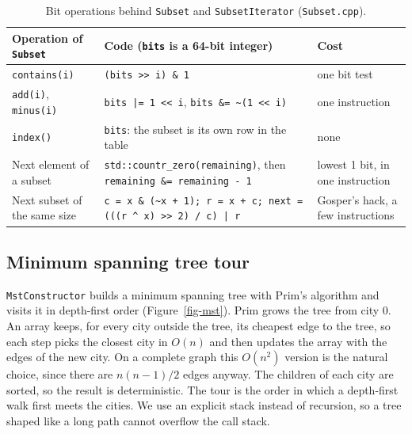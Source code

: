 \documentclass[10pt,a4paper]{article}
\begin{document}
\begin{table}[H]
\centering\footnotesize
\begin{tabularx}{\linewidth}{@{}L{3.6cm} L{7.4cm} Y@{}}
\toprule
Operation of \texttt{Subset} & Code (\texttt{bits} is a 64-bit integer) & Cost \\
\midrule
\texttt{contains(i)} & \texttt{(bits >{}> i) \& 1} & one bit test \\
\texttt{add(i)}, \texttt{minus(i)} & \texttt{bits |= 1 <{}< i}, \quad \texttt{bits \&= \textasciitilde(1 <{}< i)} & one instruction \\
\texttt{index()} & \texttt{bits}: the subset is its own row in the table & none \\
Next element of a subset & \texttt{std::countr\_zero(remaining)}, then \texttt{remaining \&= remaining - 1} & lowest 1 bit, in one instruction \\
Next subset of the same size & \texttt{c = x \& (\textasciitilde x + 1); r = x + c; next = (((r \^{} x) >{}> 2) / c) | r} & Gosper's hack, a few instructions \\
\bottomrule
\end{tabularx}
\caption{Bit operations behind \texttt{Subset} and \texttt{SubsetIterator} (\texttt{Subset.cpp}).}
\label{tab-subset}
\end{table}

\subsection{Minimum spanning tree tour}\label{sec-mst}

\texttt{MstConstructor} builds a minimum spanning tree with Prim's algorithm and visits it in depth-first order (Figure~\ref{fig-mst}). Prim grows the tree from city 0. An array keeps, for every city outside the tree, its cheapest edge to the tree, so each step picks the closest city in $O(n)$ and then updates the array with the edges of the new city. On a complete graph this $O(n^2)$ version is the natural choice, since there are $n(n-1)/2$ edges anyway. The children of each city are sorted, so the result is deterministic. The tour is the order in which a depth-first walk first meets the cities. We use an explicit stack instead of recursion, so a tree shaped like a long path cannot overflow the call stack.
\end{document}
